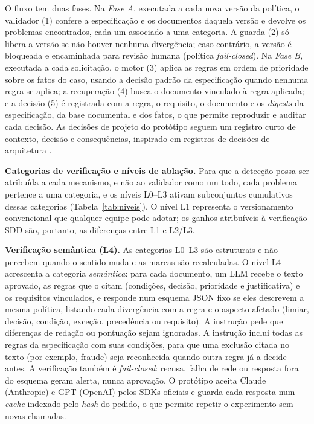 \documentclass[12pt]{article}
\begin{document}
O fluxo tem duas fases. Na \textit{Fase A}, executada a cada nova versão da política, o validador (1) confere a especificação e os documentos daquela versão e devolve os problemas encontrados, cada um associado a uma categoria. A guarda (2) só libera a versão se não houver nenhuma divergência; caso contrário, a versão é bloqueada e encaminhada para revisão humana (política \textit{fail-closed}). Na \textit{Fase B}, executada a cada solicitação, o motor (3) aplica as regras em ordem de prioridade sobre os fatos do caso, usando a decisão padrão da especificação quando nenhuma regra se aplica; a recuperação (4) busca o documento vinculado à regra aplicada; e a decisão (5) é registrada com a regra, o requisito, o documento e os \textit{digests} da especificação, da base documental e dos fatos, o que permite reproduzir e auditar cada decisão. As decisões de projeto do protótipo seguem um registro curto de contexto, decisão e consequências, inspirado em registros de decisões de arquitetura \cite{nygard2011adr}.

\textbf{Categorias de verificação e níveis de ablação.} Para que a detecção possa ser atribuída a cada mecanismo, e não ao validador como um todo, cada problema pertence a uma categoria, e os níveis L0--L3 ativam subconjuntos cumulativos dessas categorias (Tabela~\ref{tab:niveis}). O nível L1 representa o versionamento convencional que qualquer equipe pode adotar; os ganhos atribuíveis à verificação SDD são, portanto, as diferenças entre L1 e L2/L3.

\textbf{Verificação semântica (L4).} As categorias L0--L3 são estruturais e não percebem quando o sentido muda e as marcas são recalculadas. O nível L4 acrescenta a categoria \textit{semântica}: para cada documento, um LLM recebe o texto aprovado, as regras que o citam (condições, decisão, prioridade e justificativa) e os requisitos vinculados, e responde num esquema JSON fixo se eles descrevem a mesma política, listando cada divergência com a regra e o aspecto afetado (limiar, decisão, condição, exceção, precedência ou requisito). A instrução pede que diferenças de redação ou pontuação sejam ignoradas. A instrução inclui todas as regras da especificação com suas condições, para que uma exclusão citada no texto (por exemplo, fraude) seja reconhecida quando outra regra já a decide antes. A verificação também é \textit{fail-closed}: recusa, falha de rede ou resposta fora do esquema geram alerta, nunca aprovação. O protótipo aceita Claude (Anthropic) e GPT (OpenAI) pelos SDKs oficiais e guarda cada resposta num \textit{cache} indexado pelo \textit{hash} do pedido, o que permite repetir o experimento sem novas chamadas.
\end{document}
